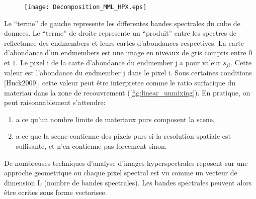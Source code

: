 \begin{figure}[h]
  \centering
  \texttt{[image: Decomposition\_MML\_HPX.eps]}
  \label{fig:decomp_mml}
\end{figure}

Le ``terme'' de gauche represente les differentes bandes spectrales du
cube de donnees. Le ``terme'' de droite represente un ``produit''
entre les spectres de reflectance des endmembers et leurs cartes
d'abondances respectives. La carte d'abondance d'un endmembers est une
image en niveaux de gris compris entre $0$ et $1$. Le pixel i de la carte
d'abondance du endmember j a pour valeur $s_{ji}$. Cette valeur est
l'abondance du endmember j dans le pixel i. Sous certaines conditions
[Huck2009], cette valeur peut être interpretee comme le ratio
surfacique du materiau dans la zone de recouvrement (\ref{fig:linear_unmixing}).  En
pratique, on peut raisonnablement s'attendre: 

\begin{enumerate}
\item{a ce qu'un nombre
limite de materiaux purs composent la scene.}
\item{a ce que la scene
contienne des pixels purs si la resolution spatiale est suffisante, et
n'en contienne pas forcement sinon.}
\end{enumerate}
 
De nombreuses techniques d'analyse d'images hyperspectrales reposent
sur une approche geometrique ou chaque pixel spectral est vu comme un
vecteur de dimension L (nombre de bandes spectrales). Les
bandes spectrales peuvent alors être ecrites sous forme vectorisee.

\begin{figure}[h]
\label{fig:mml}
\end{figure}

